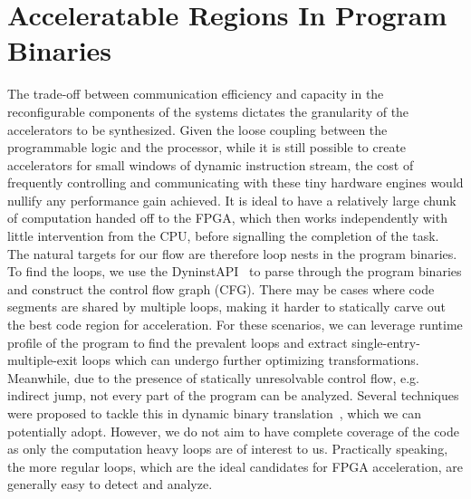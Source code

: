\section{Acceleratable Regions In Program Binaries}
The trade-off between communication efficiency and capacity
in the reconfigurable components of the systems dictates
the granularity of the accelerators to be synthesized. 
Given the loose coupling between the programmable logic and the processor,
while it is still possible to create accelerators for small windows of dynamic instruction stream, the cost of frequently controlling and communicating
with these tiny hardware engines would nullify any performance gain
achieved. 
It is ideal to have a relatively large chunk of computation
handed off to the FPGA, which then works independently with little
intervention from the CPU, before signalling the completion of the task.
The natural targets for our flow are therefore loop nests in the program
binaries. To find the loops, we use the DyninstAPI~\cite{dyninst} to parse through
the program binaries and construct the control flow graph (CFG). There may be cases where code segments are shared by multiple loops, making it harder to statically carve out the best code region for acceleration. For these
scenarios, we can leverage runtime profile of the program to find the prevalent
loops and extract single-entry-multiple-exit loops which can undergo further
optimizing transformations. 
Meanwhile, due to the presence of statically unresolvable control flow, e.g. indirect jump,
not every part of the program can be analyzed. Several techniques were
proposed to tackle this in dynamic binary translation~\cite{}, which we can potentially
adopt. However, we do not aim to have complete coverage of the code as only the
computation heavy loops are of interest to us.
Practically speaking, the more regular loops, which are the ideal candidates for FPGA acceleration, are generally easy to detect and analyze. 


